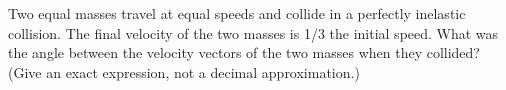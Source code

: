 Two equal masses travel at equal speeds and collide in a perfectly
inelastic collision. The final velocity of the two masses is 1/3
the initial speed. What was the angle between
the velocity vectors of the two masses when they collided? (Give
an exact expression, not a decimal approximation.)\answercheck

